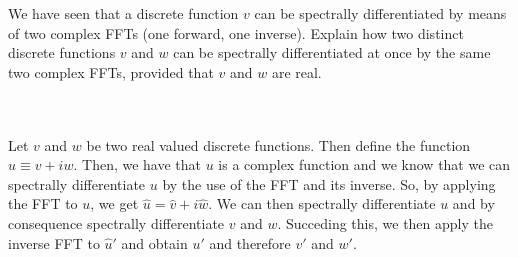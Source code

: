 We have seen that a discrete function $v$ can be spectrally differentiated by means of two complex
FFTs (one forward, one inverse). Explain how two distinct discrete functions $v$ and $w$ can be
spectrally differentiated at once by the same two complex FFTs, provided that $v$ and $w$ are real.\\\\

\begin{solution}\renewcommand{\qedsymbol}{}\ \\
    Let $v$ and $w$ be two real valued discrete functions. Then define the function $u\equiv v+iw$.
    Then, we have that $u$ is a complex function and we know that we can spectrally differentiate $u$ by
    the use of the FFT and its inverse. So, by applying the FFT to $u$, we get
    $\hat{u}=\hat{v}+i\hat{w}$. We can then spectrally differentiate $u$ and by consequence spectrally
    differentiate $v$ and $w$. Succeding this, we then apply the inverse FFT to $\hat{u}'$ and obtain
    $u'$ and therefore $v'$ and $w'$.

\end{solution}